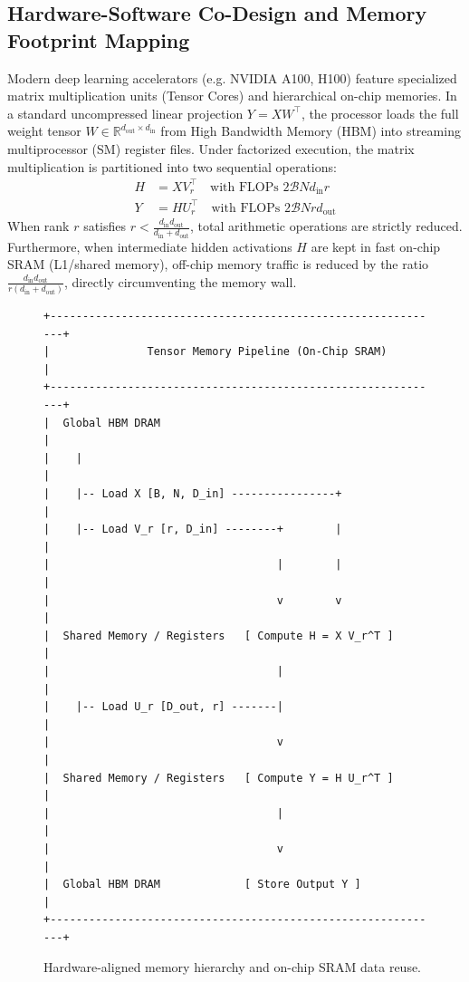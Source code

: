 \documentclass{article}
\begin{document}
\subsection{Hardware-Software Co-Design and Memory Footprint Mapping}
Modern deep learning accelerators (e.g. NVIDIA A100, H100) feature specialized matrix multiplication units (Tensor Cores) and hierarchical on-chip memories. In a standard uncompressed linear projection $Y = X W^\top$, the processor loads the full weight tensor $W \in \mathbb{R}^{d_{\text{out}} \times d_{\text{in}}}$ from High Bandwidth Memory (HBM) into streaming multiprocessor (SM) register files. Under factorized execution, the matrix multiplication is partitioned into two sequential operations:
\begin{align}
H &= X V_r^\top \quad \text{with FLOPs } 2 \mathcal{B} N d_{\text{in}} r \\
Y &= H U_r^\top \quad \text{with FLOPs } 2 \mathcal{B} N r d_{\text{out}}
\end{align}
When rank $r$ satisfies $r < \frac{d_{\text{in}} d_{\text{out}}}{d_{\text{in}} + d_{\text{out}}}$, total arithmetic operations are strictly reduced. Furthermore, when intermediate hidden activations $H$ are kept in fast on-chip SRAM (L1/shared memory), off-chip memory traffic is reduced by the ratio $\frac{d_{\text{in}} d_{\text{out}}}{r(d_{\text{in}} + d_{\text{out}})}$, directly circumventing the memory wall.

\begin{figure}[H]
\centering
\begin{verbatim}
+-------------------------------------------------------------+
|               Tensor Memory Pipeline (On-Chip SRAM)         |
+-------------------------------------------------------------+
|  Global HBM DRAM                                            |
|    |                                                        |
|    |-- Load X [B, N, D_in] ----------------+                |
|    |-- Load V_r [r, D_in] --------+        |                |
|                                   |        |                |
|                                   v        v                |
|  Shared Memory / Registers   [ Compute H = X V_r^T ]        |
|                                   |                         |
|    |-- Load U_r [D_out, r] -------|                         |
|                                   v                         |
|  Shared Memory / Registers   [ Compute Y = H U_r^T ]        |
|                                   |                         |
|                                   v                         |
|  Global HBM DRAM             [ Store Output Y ]             |
+-------------------------------------------------------------+
\end{verbatim}
\caption{Hardware-aligned memory hierarchy and on-chip SRAM data reuse.}
\label{fig:memory_hierarchy}
\end{figure}
\end{document}
